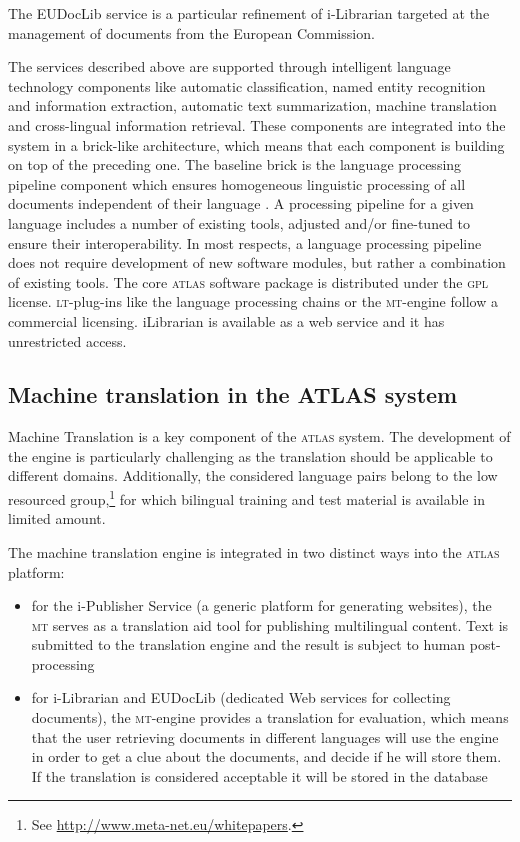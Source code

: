 \documentclass[output=paper]{LSP/langsci}
\begin{document}
The EUDocLib service is a particular refinement of i-Librarian targeted at the management of documents from the European Commission.

The services described above are supported through intelligent language technology components like automatic classification, named entity recognition and information extraction, automatic text summarization, machine translation and cross-lingual information retrieval. These components are integrated into the system in a brick-like architecture, which means that each component is building on top of the preceding one. The baseline brick is the language processing pipeline component which ensures homogeneous 
linguistic processing of all documents independent of their language \citep{BelogayEtAl2011}. A processing pipeline for a given language includes a number of existing tools, adjusted and/or fine-tuned to ensure their interoperability. In most respects, a language processing pipeline does not require development of new software modules, but rather a combination of existing tools. The core \textsc{atlas} software package is distributed under the \textsc{gpl} license. \textsc{lt}-plug-ins like the language processing chains or the \textsc{mt}-engine follow a commercial licensing. iLibrarian is available as a web service and it has unrestricted access.

\subsection{Machine translation in the ATLAS system}\label{sec:dumavertan:2.1}

Machine Translation is a key component of the \textsc{atlas} system. The development of the engine is particularly challenging as the translation should be applicable to different domains. Additionally, the considered language pairs belong to the low resourced group,\footnote{See \href{https://webmail.rrz.uni-hamburg.de/services/go.php?url=http://www.meta-net.eu/whitepapers & _t=1367956882 & _h=qm2othGZINLgZG6IS2rxpecefDQ}{http://www.meta-net.eu/whitepapers}.} for which bilingual training and test material is available in limited amount.

The machine translation engine is integrated in two distinct ways into the \textsc{atlas} platform:

\begin{itemize}
\item 
for the i-Publisher Service (a generic platform for generating websites), the \textsc{mt} serves as a translation aid tool for publishing multilingual content. Text is submitted to the translation engine and the result is subject to human post-processing
\item 
for i-Librarian and EUDocLib (dedicated Web services for collecting documents), the \textsc{mt}-engine provides a translation for evaluation, which means that the user retrieving documents in different languages will use the engine in order to get a clue about the documents, and decide if he will store them. If the translation is considered acceptable it will be stored in the database
\end{itemize}
\end{document}
